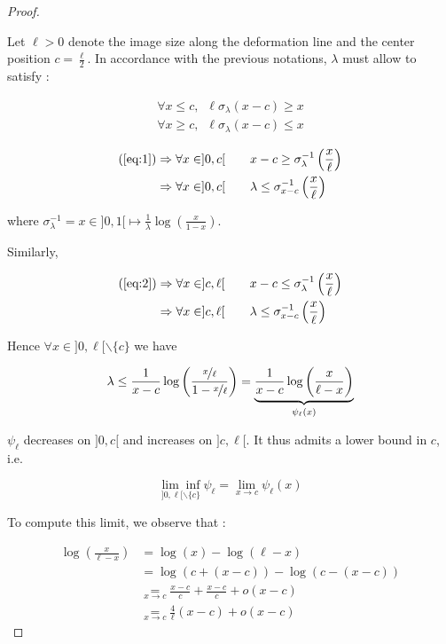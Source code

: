 \documentclass[11pt]{scrartcl}
\begin{document}
\begin{proof}\label{proof}

Let $\ell>0$ denote the image size along the deformation line and the center position $c = \frac{\ell}{2}$. In accordance with the previous notations, $\lambda$ must allow to satisfy :

\begin{align}
\forall x\leq c, \enspace \ell\sigma_\lambda(x - c)\geq x \label{eq:1}\\ 
\forall x\geq c, \enspace \ell\sigma_\lambda(x - c)\leq x \label{eq:2}
\end{align}


\begin{align}
\text{(\ref{eq:1})} &  \Rightarrow\forall x\in]0, c[\qquad x - c \geq \sigma_\lambda^{-1}\left(\frac{x}{\ell}\right) \\
& \Rightarrow\forall x\in]0, c[ \qquad \lambda \leq \sigma_{x - c}^{-1}\left(\frac{x}{\ell}\right)
\end{align}

where $\sigma_\lambda^{-1} = x\in]0,1[\longmapsto\frac{1}{\lambda}\log\left(\frac{x}{1 - x}\right)$.

Similarly,

\begin{align}
\text{(\ref{eq:2})}&  \Rightarrow\forall x\in]c, \ell[\qquad x - c \leq \sigma_\lambda^{-1}\left(\frac{x}{\ell}\right) \\
& \Rightarrow\forall x\in]c, \ell[ \qquad \lambda \leq \sigma_{x - c}^{-1}\left(\frac{x}{\ell}\right)
\end{align}


Hence $\forall x \in ]0, \ell[\smallsetminus\{c\}$ we have

$$
\lambda \leq \frac{1}{x-c}\log\left(\frac{\nicefrac{x}{\ell}}{1 - \nicefrac{x}{\ell}}\right) = \underbrace{\frac{1}{x - c}\log\left(\frac{x}{\ell - x}\right)}_{\psi_\ell(x)}
$$

$\psi_\ell$ decreases on $]0, c[$ and increases on $]c, \ell[$. It thus admits a lower bound in $c$, i.e.

$$
\underset{]0, \ell[\backslash\{c\}}{\lim\inf}\psi_\ell = \lim_{x\rightarrow c}\psi_\ell(x)
$$

To compute this limit, we observe that :

\begin{align*}
\log\left(\frac{x}{\ell - x}\right) & = \log(x) - \log(\ell - x) \\
& = \log\left(c + \left(x - c\right)\right) - \log\left(c - \left(x - c\right)\right) \\
& \underset{x \rightarrow c}{=}\frac{x - c}{c} + \frac{x - c}{c} + o\left(x - c\right) \\
& \underset{x \rightarrow c}{=} \frac{4}{\ell}\left(x - c\right) + o\left(x - c\right)
\end{align*}


\end{proof}
\end{document}

